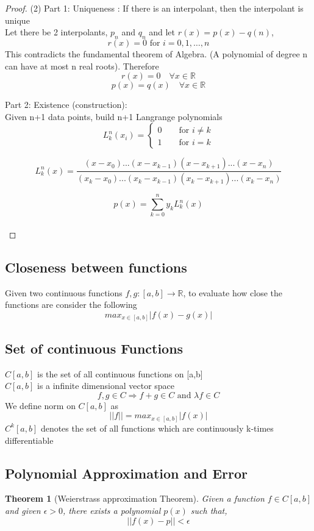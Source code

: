 \documentclass{article}
\newtheorem*{theorem}{Theorem}
\begin{document}
	\begin{proof}
		(2)  Part 1: Uniqueness : If there is an interpolant, then the interpolant is unique\\
		Let there be 2 interpolants, $p_n$ and $q_n$ and let $r(x)=p(x)-q(n)$,\\
		\[r(x)=0 \text{ for } i=0,1,\hdots,n\] 
		This contradicts the fundamental theorem of Algebra. (A polynomial of degree n can have at most n real roots). Therefore 
		\[r(x)=0 \quad \forall x \in \mathbb{R}\]
		\[p(x)=q(x) \quad \forall x \in \mathbb{R}\]

		\noindent Part 2: Existence (construction):\\
			Given n+1 data points, build n+1 Langrange polynomials 
			\[L^n_k (x_i) =
			\begin{cases}
			 0 \qquad \text{for } i\neq k \\
			 1 \qquad \text{for } i=k
			\end{cases}
			 \]

		\[L^n_k(x)= \frac{(x-x_0)...(x-x_{k-1})(x-x_{k+1})...(x-x_n)}{(x_k-x_0)...(x_k-x_{k-1})(x_k-x_{k+1})...(x_k-x_n)}\]

		\[p(x) = \sum_{k=0}^n y_k L^n_k(x)\]\\
	\end{proof}

\subsection{Closeness between functions}
	Given two continuous functions $f,g:[a,b]\rightarrow \mathbb{R}$, to evaluate how close the functions are consider the following
	\[max_{x\in [a,b]} |f(x)-g(x)|\]


\subsection{Set of continuous Functions}
	$C[a,b]$ is the set of all continuous functions on [a,b]\\
	$C[a,b]$ is a infinite dimensional vector space
	\[f,g \in C \Longrightarrow f+g \in C \text{  and  }\lambda f\in C\]
	We define norm on $C[a,b]$ as
	\[||f|| = max_{x\in [a,b]} |f(x)|\]
	$C^{k}[a,b]$ denotes the set of all functions which are continuously k-times differentiable  



\subsection{Polynomial Approximation and Error}
	\begin{theorem}[Weierstrass approximation Theorem]
		Given a function $f\in C[a,b]$ and given $\epsilon>0$, there exists a polynomial $p(x)$ such that,
		\[||f(x)-p||<\epsilon\]
	\end{theorem}
\end{document}
